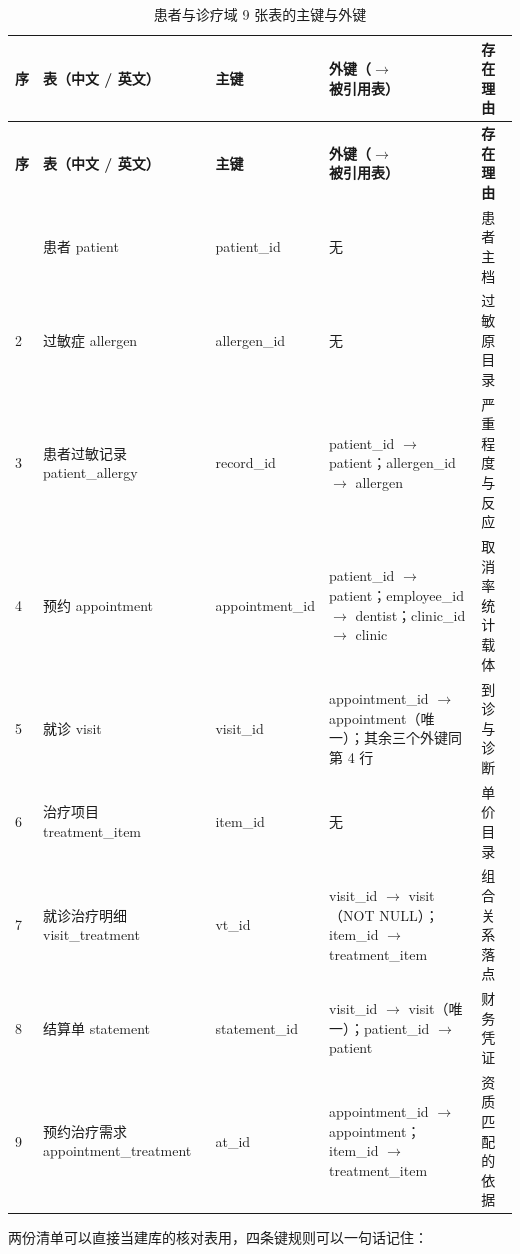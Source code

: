 \documentclass[11pt,a4paper]{ctexart}
\begin{document}
{\footnotesize
\begin{longtable}{@{}L{0.9cm}L{3.2cm}L{2.6cm}L{5.2cm}L{2.6cm}@{}}
\caption{患者与诊疗域 9 张表的主键与外键}\label{tab:tbl-pat}\\
\toprule
\textbf{\textcolor{adcblue!92}{序}} & \textbf{\textcolor{adcblue!92}{表（中文 / 英文）}} & \textbf{\textcolor{adcblue!92}{主键}} & \textbf{\textcolor{adcblue!92}{外键（$\rightarrow$ 被引用表）}} & \textbf{\textcolor{adcblue!92}{存在理由}} \\
\midrule
\endfirsthead
\toprule
\textbf{\textcolor{adcblue!92}{序}} & \textbf{\textcolor{adcblue!92}{表（中文 / 英文）}} & \textbf{\textcolor{adcblue!92}{主键}} & \textbf{\textcolor{adcblue!92}{外键（$\rightarrow$ 被引用表）}} & \textbf{\textcolor{adcblue!92}{存在理由}} \\
\midrule
\endhead
\bottomrule
{} & 患者 patient & patient\_id & 无 & 患者主档 \\
2 & 过敏症 allergen & allergen\_id & 无 & 过敏原目录 \\
3 & 患者过敏记录 patient\_allergy & record\_id & patient\_id $\rightarrow$ patient；allergen\_id $\rightarrow$ allergen & 严重程度与反应 \\
4 & 预约 appointment & appointment\_id & patient\_id $\rightarrow$ patient；employee\_id $\rightarrow$ dentist；clinic\_id $\rightarrow$ clinic & 取消率统计载体 \\
5 & 就诊 visit & visit\_id & appointment\_id $\rightarrow$ appointment（唯一）；其余三个外键同第 4 行 & 到诊与诊断 \\
6 & 治疗项目 treatment\_item & item\_id & 无 & 单价目录 \\
7 & 就诊治疗明细 visit\_treatment & vt\_id & visit\_id $\rightarrow$ visit（NOT NULL）；item\_id $\rightarrow$ treatment\_item & 组合关系落点 \\
8 & 结算单 statement & statement\_id & visit\_id $\rightarrow$ visit（唯一）；patient\_id $\rightarrow$ patient & 财务凭证 \\
9 & 预约治疗需求 appointment\_treatment & at\_id & appointment\_id $\rightarrow$ appointment；item\_id $\rightarrow$ treatment\_item & 资质匹配的依据 \\
\end{longtable}
}

两份清单可以直接当建库的核对表用，四条键规则可以一句话记住：
\end{document}
